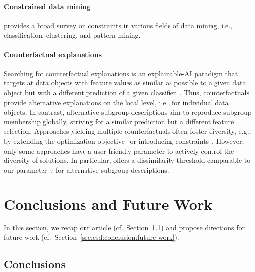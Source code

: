 \documentclass{article}
\theoremstyle{definition}
\begin{document}
\paragraph{Constrained data mining}

\cite{grossi2017survey} provides a broad survey on constraints in various fields of data mining, i.e., classification, clustering, and pattern mining.

\paragraph{Counterfactual explanations}

Searching for counterfactual explanations is an explainable-AI paradigm that targets at data objects with feature values as similar as possible to a given data object but with a different prediction of a given classifier~\cite{guidotti2022counterfactual}.
Thus, counterfactuals provide alternative explanations on the local level, i.e., for individual data objects.
In contrast, alternative subgroup descriptions aim to reproduce subgroup membership globally, striving for a similar prediction but a different feature selection.
Approaches yielding multiple counterfactuals often foster diversity, e.g., by extending the optimization objective~\cite{mothilal2020explaining} or introducing constraints~\cite{karimi2020model, mohammadi2021scaling, russell2019efficient}.
However, only some approaches have a user-friendly parameter to actively control the diversity of solutions.
In particular, \cite{mohammadi2021scaling} offers a dissimilarity threshold comparable to our parameter~$\tau$ for alternative subgroup descriptions.

\section{Conclusions and Future Work}
\label{sec:csd:conclusion}

In this section, we recap our article (cf.~Section~\ref{sec:csd:conclusion:conclusion}) and propose directions for future work (cf.~Section~\ref{sec:csd:conclusion:future-work}).

\subsection{Conclusions}
\label{sec:csd:conclusion:conclusion}
\end{document}
